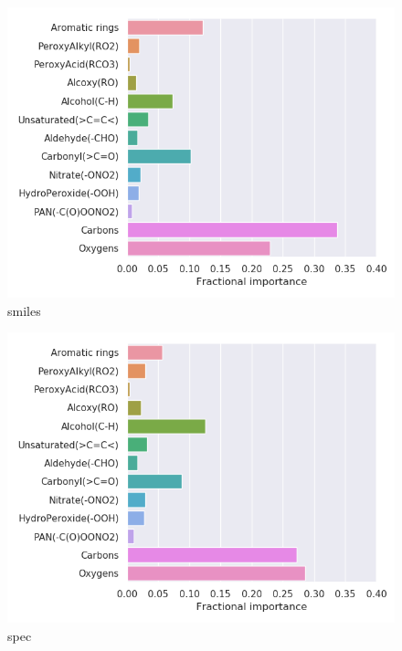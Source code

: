 \begin{subfigure}[b]{0.46\textwidth}
    \centering
    \includegraphics[width=\textwidth]{outputs/AE/smiles/legend.png}
    \caption{smiles}
    \label{fig:legend_AE_smiles}
\end{subfigure}
\begin{subfigure}[b]{0.46\textwidth}
    \centering
    \includegraphics[width=\textwidth]{outputs/AE/spec/legend.png}
    \caption{spec}
    \label{fig:legend_AE_spec}
\end{subfigure}

